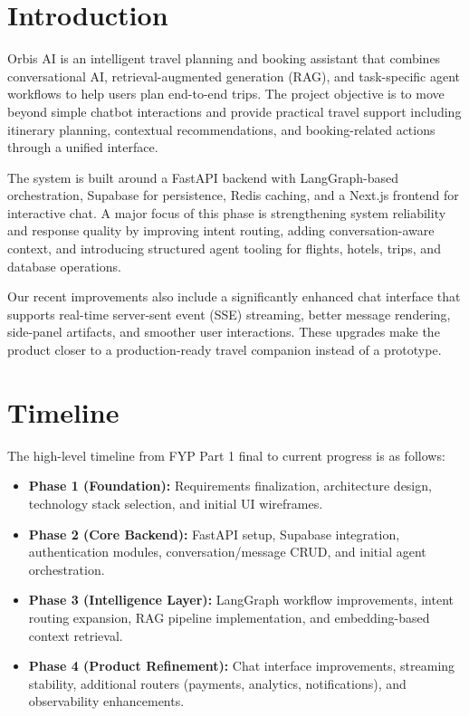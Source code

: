 \documentclass[12pt]{article}
\begin{document}
\vspace{1.5em}


\section{Introduction}
\justifying
Orbis AI is an intelligent travel planning and booking assistant that combines conversational AI, retrieval-augmented generation (RAG), and task-specific agent workflows to help users plan end-to-end trips. The project objective is to move beyond simple chatbot interactions and provide practical travel support including itinerary planning, contextual recommendations, and booking-related actions through a unified interface.

The system is built around a FastAPI backend with LangGraph-based orchestration, Supabase for persistence, Redis caching, and a Next.js frontend for interactive chat. A major focus of this phase is strengthening system reliability and response quality by improving intent routing, adding conversation-aware context, and introducing structured agent tooling for flights, hotels, trips, and database operations.

Our recent improvements also include a significantly enhanced chat interface that supports real-time server-sent event (SSE) streaming, better message rendering, side-panel artifacts, and smoother user interactions. These upgrades make the product closer to a production-ready travel companion instead of a prototype.

\section{Timeline}
The high-level timeline from FYP Part 1 final to current progress is as follows:
\begin{itemize}
    \item \textbf{Phase 1 (Foundation):} Requirements finalization, architecture design, technology stack selection, and initial UI wireframes.
    \item \textbf{Phase 2 (Core Backend):} FastAPI setup, Supabase integration, authentication modules, conversation/message CRUD, and initial agent orchestration.
    \item \textbf{Phase 3 (Intelligence Layer):} LangGraph workflow improvements, intent routing expansion, RAG pipeline implementation, and embedding-based context retrieval.
    \item \textbf{Phase 4 (Product Refinement):} Chat interface improvements, streaming stability, additional routers (payments, analytics, notifications), and observability enhancements.
\end{itemize}
\end{document}
